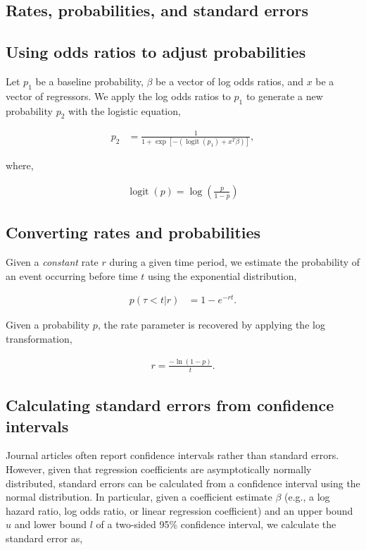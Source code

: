 \documentclass[11pt,final,fleqn]{article}
\theoremstyle{plain}
\DeclareMathOperator{\logit}{logit}
\begin{document}
\begin{appendices}
\setcounter{table}{0}
\renewcommand{\thetable}{A\arabic{table}}
\setcounter{figure}{0}
\renewcommand{\thefigure}{A\arabic{figure}}
\setcounter{equation}{0}
\renewcommand{\theequation}{A\arabic{equation}}

\section{Rates, probabilities, and standard errors}\label{app:math}
\subsection{Using odds ratios to adjust probabilities}\label{app:odds-ratio-prob}
Let $p_1$ be a baseline probability, $\beta$ be a vector of log odds ratios, and $x$ be a vector of regressors. We apply the log odds ratios to $p_1$ to generate a new probability $p_2$ with the logistic equation,

\begin{align}
p_2 &= \frac{1}{1 + \exp\left[-\left(\logit(p_1) + x^T\beta \right)\right]},
\end{align}

where,

\begin{align}
\logit(p) = \log\left(\frac{p}{1-p}\right)
\end{align}

\subsection{Converting rates and probabilities}\label{app:rate-prob}
Given a \emph{constant} rate $r$ during a given time period, we estimate the probability of an event occurring before time $t$ using the exponential distribution,

\begin{align}
p(\tau < t |r) &= 1 - e^{-rt}.
\end{align}

Given a probability $p$, the rate parameter is recovered by applying the log transformation,

\begin{align}
r = \frac{-\ln(1-p)}{t}.
\end{align}

\subsection{Calculating standard errors from confidence intervals}\label{app:ci-se}
Journal articles often report confidence intervals rather than standard errors. However, given that regression coefficients are asymptotically normally distributed, standard errors can be calculated from a confidence interval using the normal distribution. In particular, given a coefficient estimate $\beta$ (e.g., a log hazard ratio, log odds ratio, or linear regression coefficient) and an upper bound $u$ and lower bound $l$ of a two-sided 95\% confidence interval, we calculate the standard error as,


\end{appendices}
\end{document}
